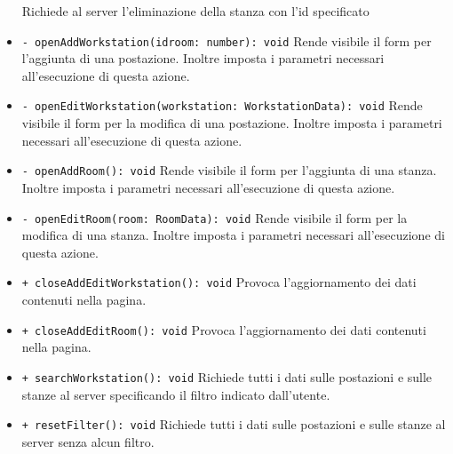 \begin{itemize}
	Richiede al server l'eliminazione della stanza con l'id specificato
	\item \texttt{- openAddWorkstation(idroom: number): void} \newline
	Rende visibile il form per l'aggiunta di una postazione. Inoltre imposta i parametri necessari all'esecuzione di questa azione.
	\item \texttt{- openEditWorkstation(workstation: WorkstationData): void} \newline
	Rende visibile il form per la modifica di una postazione. Inoltre imposta i parametri necessari all'esecuzione di questa azione. 
	\item \texttt{- openAddRoom(): void} \newline
	Rende visibile il form per l'aggiunta di una stanza. Inoltre imposta i parametri necessari all'esecuzione di questa azione.
	\item \texttt{- openEditRoom(room: RoomData): void} \newline
	Rende visibile il form per la modifica di una stanza. Inoltre imposta i parametri necessari all'esecuzione di questa azione.
	\item \texttt{+ closeAddEditWorkstation(): void} \newline
	Provoca l'aggiornamento dei dati contenuti nella pagina.
	\item \texttt{+ closeAddEditRoom(): void} \newline
	Provoca l'aggiornamento dei dati contenuti nella pagina.
	\item \texttt{+ searchWorkstation(): void} \newline
	Richiede tutti i dati sulle postazioni e sulle stanze al server specificando il filtro indicato dall'utente.
	\item \texttt{+ resetFilter(): void} \newline
	Richiede tutti i dati sulle postazioni e sulle stanze al server senza alcun filtro.
\end{itemize}
	
